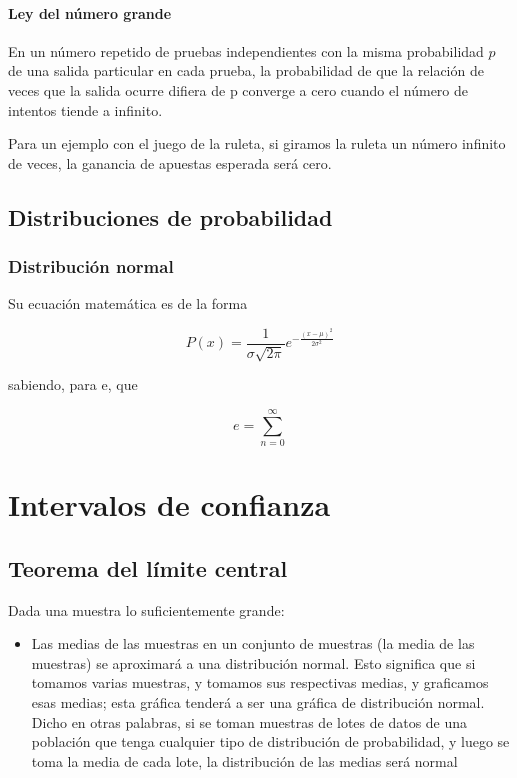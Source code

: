 \paragraph{Ley del número grande}
En un número repetido de pruebas independientes con la misma probabilidad $p$ de una salida particular en cada prueba, la probabilidad de que la relación de veces que la salida ocurre difiera de p converge a cero cuando el número de intentos tiende a infinito.

Para un ejemplo con el juego de la ruleta, si giramos la ruleta un número infinito de veces, la ganancia de apuestas esperada será cero. 

\subsection{Distribuciones de probabilidad}

\subsubsection{Distribución normal}

Su ecuación matemática es de la forma 

\begin{equation}
    P(x) = \frac{1}{\sigma \sqrt{2 \pi}} e^{- \frac{(x-\mu)^2}{2 \sigma ^2}}
\end{equation}

sabiendo, para e, que

\begin{equation}
    e = \sum_{n=0}^{\infty}
\end{equation}

\section{Intervalos de confianza}

\subsection{Teorema del límite central}

Dada una muestra lo suficientemente grande: 
\begin{itemize}
    \item Las medias de las muestras en un conjunto de muestras (la media de las muestras) se aproximará a una distribución normal. Esto significa que si tomamos varias muestras, y tomamos sus respectivas medias, y graficamos esas medias; esta gráfica tenderá a ser una gráfica de distribución normal. Dicho en otras palabras, si se toman muestras de lotes de datos de una población que tenga cualquier tipo de distribución de probabilidad, y luego se toma la media de cada lote, la distribución de las medias será normal 
\end{itemize}

